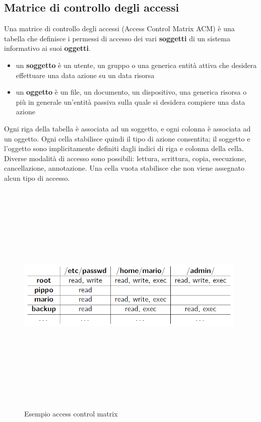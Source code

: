 \subsection{Matrice di controllo degli accessi} 
Una matrice di controllo degli accessi (Access Control Matrix ACM) è una tabella che definisce i permessi di accesso dei vari \textbf{soggetti} di un sistema informativo ai suoi \textbf{oggetti}.
\begin{itemize} 
  \item un \textbf{soggetto} è un utente, un gruppo o una generica entità attiva che desidera effettuare una data azione su un data risorsa
  \item un \textbf{oggetto} è un file, un documento, un dispositivo, una generica risorsa o più in generale un'entità passiva sulla quale si desidera compiere una data azione
\end{itemize}

Ogni riga della tabella è associata ad un soggetto, e ogni colonna è associata ad un oggetto. Ogni cella stabilisce quindi il tipo di azione consentita; il soggetto e l'oggetto sono implicitamente definiti dagli indici di riga e colonna della cella. Diverse modalità di accesso sono possibili: lettura, scrittura, copia, esecuzione, cancellazione, annotazione. Una cella vuota stabilisce che non viene assegnato alcun tipo di accesso.
\begin{figure}[htbp]
	\centering%
	\subfigure%
	{\includegraphics[height=11cm, width=11cm, keepaspectratio]{Immagini/introduzione/access_control_matrix_ex.png}}
	\caption{Esempio access control matrix \label{fig:acm}} 	
\end{figure}

